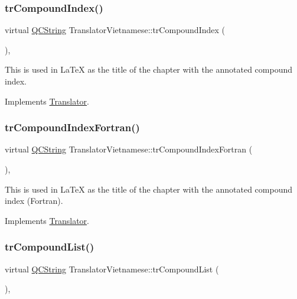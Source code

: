 \subsubsection{\texorpdfstring{trCompoundIndex()}{trCompoundIndex()}}
{\footnotesize\ttfamily virtual \mbox{\hyperlink{class_q_c_string}{Q\+C\+String}} Translator\+Vietnamese\+::tr\+Compound\+Index (\begin{DoxyParamCaption}{ }\end{DoxyParamCaption})\hspace{0.3cm}{\ttfamily [inline]}, {\ttfamily [virtual]}}

This is used in La\+TeX as the title of the chapter with the annotated compound index. 

Implements \mbox{\hyperlink{class_translator}{Translator}}.

\mbox{\label{class_translator_vietnamese_af77682122b155e51ca9d58bf628597f8}} 
\subsubsection{\texorpdfstring{trCompoundIndexFortran()}{trCompoundIndexFortran()}}
{\footnotesize\ttfamily virtual \mbox{\hyperlink{class_q_c_string}{Q\+C\+String}} Translator\+Vietnamese\+::tr\+Compound\+Index\+Fortran (\begin{DoxyParamCaption}{ }\end{DoxyParamCaption})\hspace{0.3cm}{\ttfamily [inline]}, {\ttfamily [virtual]}}

This is used in La\+TeX as the title of the chapter with the annotated compound index (Fortran). 

Implements \mbox{\hyperlink{class_translator}{Translator}}.

\mbox{\label{class_translator_vietnamese_a712cbff64ed48eac757f553af0aef104}} 
\subsubsection{\texorpdfstring{trCompoundList()}{trCompoundList()}}
{\footnotesize\ttfamily virtual \mbox{\hyperlink{class_q_c_string}{Q\+C\+String}} Translator\+Vietnamese\+::tr\+Compound\+List (\begin{DoxyParamCaption}{ }\end{DoxyParamCaption})\hspace{0.3cm}{\ttfamily [inline]}, {\ttfamily [virtual]}}

